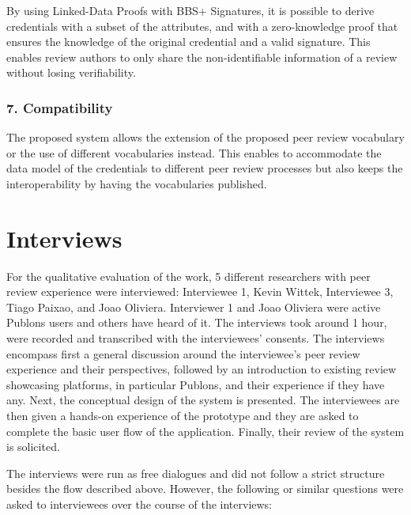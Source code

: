 By using Linked-Data Proofs with BBS+ Signatures, it is possible to derive credentials with a subset of the attributes, and with a zero-knowledge proof that ensures the knowledge of the original credential and a valid signature. This enables review authors to only share the non-identifiable information of a review without losing verifiability.

\subsubsection{7. Compatibility}

The proposed system allows the extension of the proposed peer review vocabulary or the use of different vocabularies instead. This enables to accommodate the data model of the credentials to different peer review processes but also keeps the interoperability by having the vocabularies published. 

\section{Interviews}

For the qualitative evaluation of the work, 5 different researchers with peer review experience were interviewed: Interviewee 1, Kevin Wittek, Interviewee 3, Tiago Paixao, and Joao Oliviera. Interviewer 1 and Joao Oliviera were active Publons users and others have heard of it. The interviews took around 1 hour, were recorded and transcribed with the interviewees' consents. The interviews encompass first a general discussion around the interviewee's peer review experience and their perspectives, followed by an introduction to existing review showcasing platforms, in particular Publons, and their experience if they have any. Next, the conceptual design of the system is presented. The interviewees are then given a hands-on experience of the prototype and they are asked to complete the basic user flow of the application. Finally, their review of the system is solicited. 

The interviews were run as free dialogues and did not follow a strict structure besides the flow described above. However, the following or similar questions were asked to interviewees over the course of the interviews:

